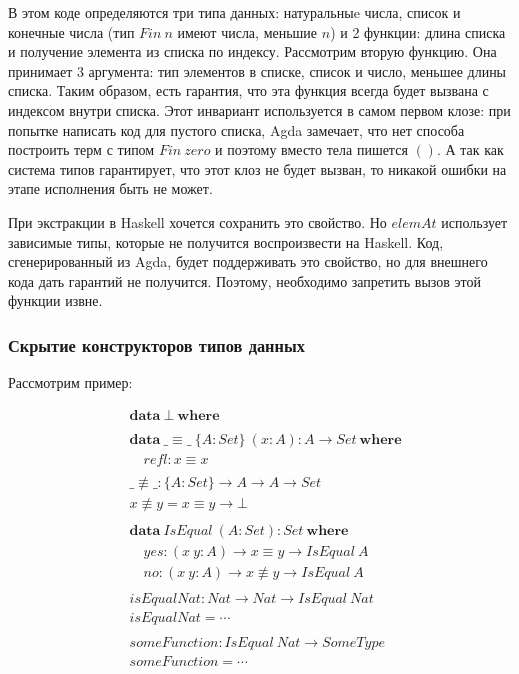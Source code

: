 В этом коде определяются три типа данных: натуральныe числа,
список и конечные числа (тип \(Fin\ n\) имеют числа, меньшие \(n\)) и
2 функции: длина списка и получение элемента из списка по индексу.
Рассмотрим вторую функцию. Она принимает 3 аргумента: тип элементов
в списке, список и число, меньшее длины списка. Таким образом, есть
гарантия, что эта функция всегда будет вызвана с индексом внутри списка.
Этот инвариант используется в самом первом клозе:
при попытке написать код для пустого списка, Agda замечает, что нет способа
построить терм с типом \(Fin\ zero\) и поэтому вместо тела пишется \(()\).
А так как система типов гарантирует, что этот клоз не будет вызван, то
никакой ошибки на этапе исполнения быть не может.

\label{text:limited-interface}
При экстракции в Haskell хочется сохранить это свойство. Но \(elemAt\)
использует зависимые типы, которые не получится воспроизвести на Haskell.
Код, сгенерированный из Agda, будет поддерживать это свойство, но для
внешнего кода дать гарантий не получится. Поэтому, необходимо запретить
вызов этой функции извне.

\subsubsection{Скрытие конструкторов типов данных}\label{sec:task-hiding-constructors}

Рассмотрим пример:

\begin{align*}
&\mathbf{data}\ \bot\ \mathbf{where}\\
\\
&\mathbf{data}\ \_\equiv\_\ \{A : Set\}\ (x : A) : A \rightarrow Set\ \mathbf{where}\\
&\quad refl : x \equiv x\\
\\
&\_\not\equiv\_ : \{A : Set\} \rightarrow A \rightarrow A \rightarrow Set\\
&x \not\equiv y = x \equiv y \rightarrow \bot\\
\\
&\mathbf{data}\ IsEqual\ (A : Set) : Set\ \mathbf{where}\\
&\quad yes : (x\ y : A) \rightarrow x \equiv y \rightarrow IsEqual\ A\\
&\quad no : (x\ y : A) \rightarrow x \not\equiv y \rightarrow IsEqual\ A\\
\\
&isEqualNat : Nat \rightarrow Nat \rightarrow IsEqual\ Nat\\
&isEqualNat = \cdots\\
\\
&someFunction : IsEqual\ Nat \rightarrow SomeType\\
&someFunction = \cdots
\end{align*}

